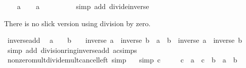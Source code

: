 \begin{isabellebody}
\isamarkupfalse%
\isanewline
\ \ \isamarkupfalse%
\ a\isanewline
\ \ \isamarkupfalse%
\ {\isachardoublequoteopen}a\ {\isacharslash}{\kern0pt}\ {}\ {\isacharequal}{\kern0pt}\ {}{\isachardoublequoteclose}\isanewline
\ \ \ \ \isamarkupfalse%
\ {\isacharparenleft}{\kern0pt}simp\ add{\isacharcolon}{\kern0pt}\ divide{\isacharunderscore}{\kern0pt}inverse{\isacharparenright}{\kern0pt}\isanewline
{}\isamarkupfalse%
%
\endisatagproof
{\isafoldproof}%
%
\isadelimproof
%
\endisadelimproof
%
\begin{isamarkuptext}%
There is no slick version using division by zero.%
\end{isamarkuptext}\isamarkuptrue%
\isamarkupfalse%
\ inverse{\isacharunderscore}{\kern0pt}add{\isacharcolon}{\kern0pt}\isanewline
\ \ {\isachardoublequoteopen}a\ {\isasymnoteq}\ {}\ {\isasymLongrightarrow}\ b\ {\isasymnoteq}\ {}\ {\isasymLongrightarrow}\ inverse\ a\ {\isacharplus}{\kern0pt}\ inverse\ b\ {\isacharequal}{\kern0pt}\ {\isacharparenleft}{\kern0pt}a\ {\isacharplus}{\kern0pt}\ b{\isacharparenright}{\kern0pt}\ {\isacharasterisk}{\kern0pt}\ inverse\ a\ {\isacharasterisk}{\kern0pt}\ inverse\ b{\isachardoublequoteclose}\isanewline
%
\isadelimproof
\ \ %
\endisadelimproof
%
\isatagproof
{}\isamarkupfalse%
\ {\isacharparenleft}{\kern0pt}simp\ add{\isacharcolon}{\kern0pt}\ division{\isacharunderscore}{\kern0pt}ring{\isacharunderscore}{\kern0pt}inverse{\isacharunderscore}{\kern0pt}add\ ac{\isacharunderscore}{\kern0pt}simps{\isacharparenright}{\kern0pt}%
\endisatagproof
{\isafoldproof}%
%
\isadelimproof
\isanewline
%
\endisadelimproof
\isanewline
{}\isamarkupfalse%
\ nonzero{\isacharunderscore}{\kern0pt}mult{\isacharunderscore}{\kern0pt}divide{\isacharunderscore}{\kern0pt}mult{\isacharunderscore}{\kern0pt}cancel{\isacharunderscore}{\kern0pt}left\ {\isacharbrackleft}{\kern0pt}simp{\isacharbrackright}{\kern0pt}{\isacharcolon}{\kern0pt}\isanewline
\ \ \ {\isacharbrackleft}{\kern0pt}simp{\isacharbrackright}{\kern0pt}{\isacharcolon}{\kern0pt}\ {\isachardoublequoteopen}c\ {\isasymnoteq}\ {}{\isachardoublequoteclose}\isanewline
\ \ \ {\isachardoublequoteopen}{\isacharparenleft}{\kern0pt}c\ {\isacharasterisk}{\kern0pt}\ a{\isacharparenright}{\kern0pt}\ {\isacharslash}{\kern0pt}\ {\isacharparenleft}{\kern0pt}c\ {\isacharasterisk}{\kern0pt}\ b{\isacharparenright}{\kern0pt}\ {\isacharequal}{\kern0pt}\ a\ {\isacharslash}{\kern0pt}\ b{\isachardoublequoteclose}\isanewline

\end{isabellebody}
